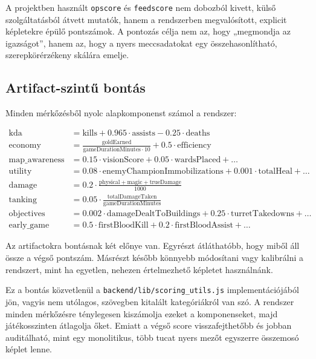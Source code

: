 \documentclass[a4paper,12pt]{report}
\begin{document}
A projektben használt \texttt{opscore} és \texttt{feedscore} nem dobozból kivett, külső szolgáltatásból átvett mutatók, hanem a rendszerben megvalósított, explicit képletekre épülő pontszámok. A pontozás célja nem az, hogy „megmondja az igazságot”, hanem az, hogy a nyers meccsadatokat egy összehasonlítható, szerepkörérzékeny skálára emelje.

\subsection{Artifact-szintű bontás}

Minden mérkőzésből nyolc alapkomponenst számol a rendszer:

\begin{align}
\text{kda} &= \text{kills} + 0.965 \cdot \text{assists} - 0.25 \cdot \text{deaths} \\
\text{economy} &= \frac{\text{goldEarned}}{\text{gameDurationMinutes} \cdot 10} + 0.5 \cdot \text{efficiency} \\
\text{map\_awareness} &= 0.15 \cdot \text{visionScore} + 0.05 \cdot \text{wardsPlaced} + \dots \\
\text{utility} &= 0.08 \cdot \text{enemyChampionImmobilizations} + 0.001 \cdot \text{totalHeal} + \dots \\
\text{damage} &= 0.2 \cdot \frac{\text{physical} + \text{magic} + \text{trueDamage}}{1000} \\
\text{tanking} &= 0.05 \cdot \frac{\text{totalDamageTaken}}{\text{gameDurationMinutes}} \\
\text{objectives} &= 0.002 \cdot \text{damageDealtToBuildings} + 0.25 \cdot \text{turretTakedowns} + \dots \\
\text{early\_game} &= 0.5 \cdot \text{firstBloodKill} + 0.2 \cdot \text{firstBloodAssist} + \dots
\end{align}

Az artifactokra bontásnak két előnye van. Egyrészt átláthatóbb, hogy miből áll össze a végső pontszám. Másrészt később könnyebb módosítani vagy kalibrálni a rendszert, mint ha egyetlen, nehezen értelmezhető képletet használnánk.

Ez a bontás közvetlenül a \texttt{backend/lib/scoring\_utils.js} implementációjából jön, vagyis nem utólagos, szövegben kitalált kategóriákról van szó. A rendszer minden mérkőzésre ténylegesen kiszámolja ezeket a komponenseket, majd játékosszinten átlagolja őket. Emiatt a végső score visszafejthetőbb és jobban auditálható, mint egy monolitikus, több tucat nyers mezőt egyszerre összemosó képlet lenne.
\end{document}
